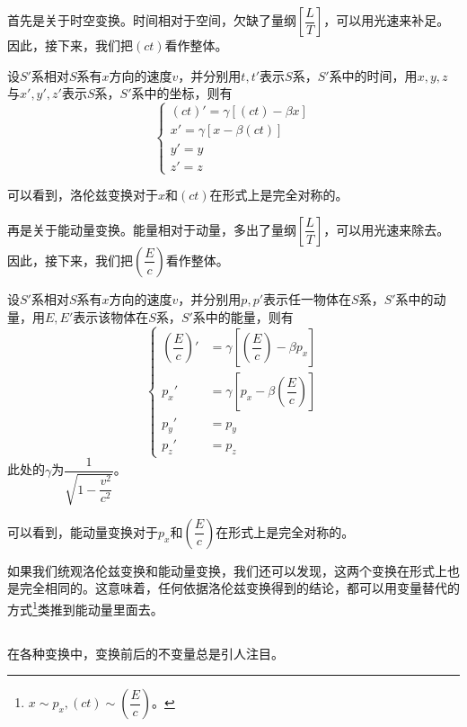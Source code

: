 首先是关于时空变换。时间相对于空间，欠缺了量纲$\left[\dfrac{L}{T}\right]$，可以用光速来补足。因此，接下来，我们把$(ct)$看作整体。
\begin{law}
	设$S'$系相对$S$系有$x$方向的速度$v$，并分别用$t,t'$表示$S$系，$S'$系中的时间，用$x,y,z$与$x',y',z'$表示$S$系，$S'$系中的坐标，则有
	\[\left\{\begin{array}{l}
		(ct)'=\gamma[(ct)-\beta x]\\
		x'=\gamma[x-\beta(ct)]\\
		y'=y\\
		z'=z
	\end{array}\right.\]
\end{law}

可以看到，洛伦兹变换对于$x$和$(ct)$在形式上是完全对称的。

再是关于能动量变换。能量相对于动量，多出了量纲$\left[\dfrac{L}{T}\right]$，可以用光速来除去。因此，接下来，我们把$\left(\dfrac{E}{c}\right)$看作整体。
\begin{law}
	设$S'$系相对$S$系有$x$方向的速度$v$，并分别用$p,p'$表示任一物体在$S$系，$S'$系中的动量，用$E,E'$表示该物体在$S$系，$S'$系中的能量，则有
	\[\left\{\begin{aligned}
		\left(\dfrac{E}{c}\right)'&=\gamma\left[\left(\dfrac{E}{c}\right)-\beta p_x\right]\\
		p_x'&=\gamma\left[p_x-\beta\left(\dfrac{E}{c}\right)\right]\\
		p_y'&=p_y\\
		p_z'&=p_z
	\end{aligned}\right.\]
	此处的$\gamma$为$\dfrac{1}{\sqrt{1-\dfrac{v^2}{c^2}}}$。
\end{law}

可以看到，能动量变换对于$p_x$和$\left(\dfrac{E}{c}\right)$在形式上是完全对称的。

如果我们统观洛伦兹变换和能动量变换，我们还可以发现，这两个变换在形式上也是完全相同的。这意味着，任何依据洛伦兹变换得到的结论，都可以用变量替代的方式\footnote{$x\sim p_x,(ct)\sim\left(\dfrac{E}{c}\right)$。}类推到能动量里面去。
\subsection[不变量]{}
在各种变换中，变换前后的不变量总是引人注目。

